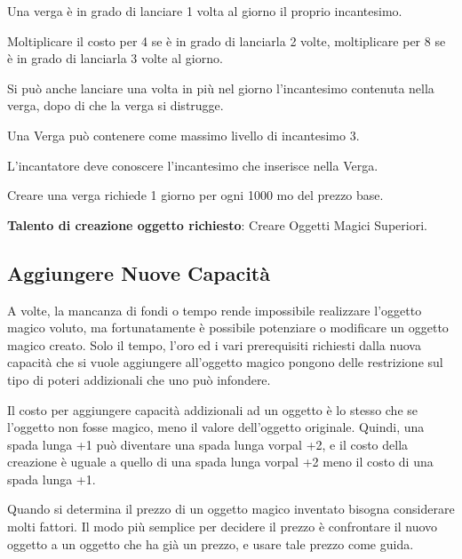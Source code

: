 \begin{multicols}{2}
	Una verga è in grado di lanciare 1 volta al giorno il proprio incantesimo.

	Moltiplicare il costo per 4 se è in grado di lanciarla 2 volte, moltiplicare per 8 se è in grado di lanciarla 3 volte al giorno.

	Si può anche lanciare una volta in più nel giorno l'incantesimo contenuta nella verga, dopo di che la verga si distrugge.

	Una Verga può contenere come massimo livello di incantesimo 3.

	L'incantatore deve conoscere l'incantesimo che inserisce nella Verga.

	Creare una verga richiede 1 giorno per ogni 1000 mo del prezzo base.

	\textbf{Talento di creazione oggetto richiesto}: Creare Oggetti Magici Superiori.

	\subsection{Aggiungere Nuove Capacità}

	A volte, la mancanza di fondi o tempo rende impossibile realizzare l'oggetto magico voluto, ma fortunatamente è possibile potenziare o modificare un oggetto magico creato. Solo il tempo, l'oro ed i vari prerequisiti richiesti dalla nuova capacità che si vuole aggiungere all'oggetto magico pongono delle restrizione sul tipo di poteri addizionali che uno può infondere.

	Il costo per aggiungere capacità addizionali ad un oggetto è lo stesso che se l'oggetto non fosse magico, meno il valore dell'oggetto originale. Quindi, una spada lunga +1 può diventare una spada lunga vorpal +2, e il costo della creazione è uguale a quello di una spada lunga vorpal +2 meno il costo di una spada lunga +1.

	Quando si determina il prezzo di un oggetto magico inventato bisogna considerare molti fattori. Il modo più semplice per decidere il prezzo è confrontare il nuovo oggetto a un oggetto che ha già un prezzo, e usare tale prezzo come guida.

\end{multicols}

\vfill

